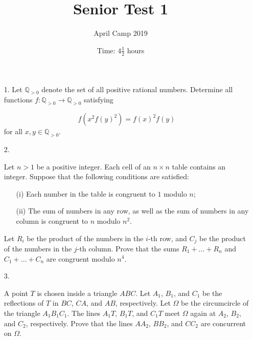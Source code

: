 \documentclass[a4paper, 12pt]{article}
\title{Senior Test 1}
\author{April Camp 2019}
\date{Time: $4 \frac{1}{2}$ hours}
\begin{document}
 \maketitle

\begin{enumerate}

\item[1.]  Let $\mathbb{Q}_{> 0}$ denote the set of all positive rational numbers. Determine all functions $f: \mathbb{Q}_{> 0} \to \mathbb{Q}_{> 0}$ satisfying

$$ f \left( x^2 f(y)^2\right) = f(x)^2 f(y) $$
for all $x, y \in \mathbb{Q}_{> 0}$. \\

\vspace{20pt}

\item[2.]    

Let $n > 1$ be a positive integer. Each cell of an $n \times n$ table contains an integer. Suppose that the following conditions are satisfied:

\begin{enumerate}
    \item[(i)] Each number in the table is congruent to $1$ modulo $n$;
    
    \item[(ii)] The sum of numbers in any row, as well as the sum of numbers in any column is congruent to $n$ modulo $n^2$.
    
\end{enumerate}

Let $R_i$ be the product of the numbers in the $i$-th row, and $C_j$ be the product of the numbers in the $j$-th column. Prove that the sums $R_1 + \dots + R_n$ and $C_1 + \dots + C_n$ are congruent modulo $n^4$.


\vspace{20pt}

\item[3.]   

A point $T$ is chosen inside a triangle $ABC$. Let $A_1$, $B_1$, and $C_1$ be the reflections of $T$ in $BC$, $CA$, and $AB$, respectively. Let $\Omega$ be the circumcircle of the triangle $A_1 B_1 C_1$. The lines $A_1 T$, $B_1 T$, and $C_1 T$ meet $\Omega$ again at $A_2$, $B_2$, and $C_2$, respectively. Prove that the lines $AA_2$, $BB_2$, and $CC_2$ are concurrent on $\Omega$.

\end{enumerate}
\end{document}
